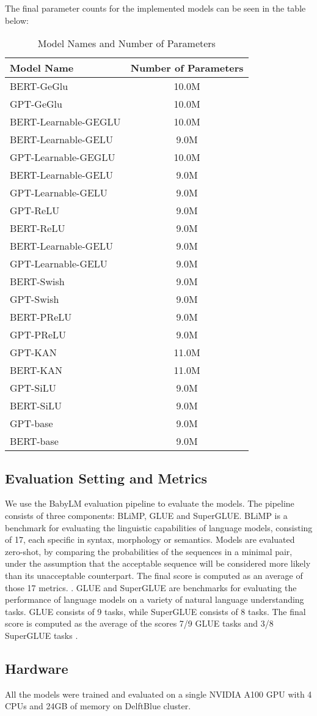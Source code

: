 The final parameter counts for the implemented models can be seen in the table below:
\begin{table}[h!]
    \centering
    \begin{tabular}{|l|c|}
    \hline
    \textbf{Model Name} & \textbf{Number of Parameters} \\ \hline
    BERT-GeGlu & 10.0M \\ \hline
    GPT-GeGlu & 10.0M \\ \hline
    BERT-Learnable-GEGLU & 10.0M \\ \hline
    BERT-Learnable-GELU & 9.0M \\ \hline
    GPT-Learnable-GEGLU & 10.0M \\ \hline
    BERT-Learnable-GELU & 9.0M \\ \hline
    GPT-Learnable-GELU & 9.0M \\ \hline
    GPT-ReLU & 9.0M \\ \hline
    BERT-ReLU & 9.0M \\ \hline
    BERT-Learnable-GELU & 9.0M \\ \hline
    GPT-Learnable-GELU & 9.0M \\ \hline
    BERT-Swish & 9.0M \\ \hline
    GPT-Swish & 9.0M \\ \hline
    BERT-PReLU & 9.0M \\ \hline
    GPT-PReLU & 9.0M \\ \hline
    GPT-KAN & 11.0M \\ \hline
    BERT-KAN & 11.0M \\ \hline
    GPT-SiLU & 9.0M \\ \hline
    BERT-SiLU & 9.0M \\ \hline
    GPT-base & 9.0M \\ \hline
    BERT-base & 9.0M \\ \hline
    \end{tabular}
    \caption{Model Names and Number of Parameters}
\end{table}

\subsection{Evaluation Setting and Metrics}
We use the BabyLM evaluation pipeline \cite{Warstadt2023} to evaluate the models. The pipeline consists of three components: BLiMP, GLUE and SuperGLUE. BLiMP is a benchmark for evaluating the linguistic capabilities of language models, consisting of 17, each specific in syntax, morphology or semantics. Models are evaluated zero-shot, by comparing the probabilities of the sequences in a minimal pair, under the assumption that the acceptable sequence will be considered more likely than its unacceptable counterpart. The final score is computed as an average of those 17 metrics. \cite{Warstadt2023blimp} \cite{warstadt-etal-2023-findings}.  GLUE and SuperGLUE are benchmarks for evaluating the performance of language models on a variety of natural language understanding tasks. GLUE consists of 9 tasks, while SuperGLUE consists of 8 tasks. The final score is computed as the average of the scores 7/9 GLUE tasks and 3/8 SuperGLUE tasks \cite{Wang2019} \cite{Wang2020}.

\subsection{Hardware}
All the models were trained and evaluated on a single NVIDIA A100 GPU with 4 CPUs and 24GB of memory on DelftBlue cluster.